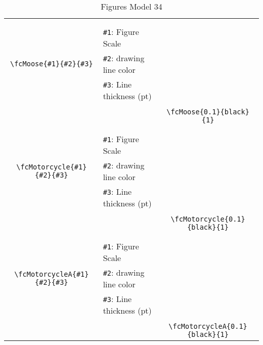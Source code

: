 \documentclass[x11names]{article}
\begin{document}
\begin{table}[H]
\begin{tabular}{|c|l|c|}
	&&\multirow{5}{*}{\fcMoose{0.1}{black}{1}}\\	&&\\	&\verb|#1|: Figure Scale &\\	\verb|\fcMoose{#1}{#2}{#3}|&	\verb|#2|: drawing line color &\\	&\verb|#3|: Line thickness (pt) &\\ &&\\&&	\verb|\fcMoose{0.1}{black}{1}|\\\hline 	
	&&\multirow{5}{*}{\fcMotorcycle{0.1}{black}{1}}\\	&&\\	&\verb|#1|: Figure Scale &\\	\verb|\fcMotorcycle{#1}{#2}{#3}|&	\verb|#2|: drawing line color &\\	&\verb|#3|: Line thickness (pt) &\\ &&\\&&	\verb|\fcMotorcycle{0.1}{black}{1}|\\\hline 	
	&&\multirow{5}{*}{\fcMotorcycleA{0.1}{black}{1}}\\	&&\\	&\verb|#1|: Figure Scale &\\	\verb|\fcMotorcycleA{#1}{#2}{#3}|&	\verb|#2|: drawing line color &\\	&\verb|#3|: Line thickness (pt) &\\ &&\\&&	\verb|\fcMotorcycleA{0.1}{black}{1}|\\\hline 	\hline\end{tabular}\caption{Figures Model 34}\label{tab34}\end{table}
\end{document}
